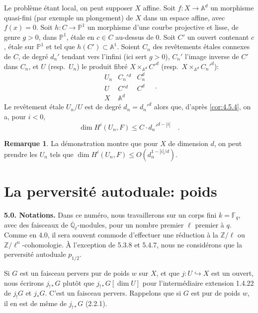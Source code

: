 \documentclass[12pt,a4paper]{article}
\theoremstyle{plain}
\theoremstyle{definition}
\newtheorem{remark}[theorem]{Remarque}
\newcommand{\into}{\hookrightarrow}
\begin{document}
Le probl\`{e}me \'{e}tant local, on peut supposer $X$ affine. Soit $f: X \to \mathbb{A}^{d}$ un morphisme quasi-fini (par exemple un plongement) de $X$ dans un espace affine, avec $f(x) = 0$. Soit $h: C \to \mathbb{P}^{1}$ un morphisme d'une courbe projective et lisse, de genre $g > 0$, dans $\mathbb{P}^{1}$, \'{e}tale en $c \in C$ au-dessus de $0$. Soit $C'$ un ouvert contenant $c$, \'{e}tale sur $\mathbb{P}^{1}$ et tel que $h(C') \subset \mathbb{A}^{1}$. Soient $C_{n}$ des rev\^{e}tements \'{e}tales connexes de $C$, de degr\'{e} $d_{n}'$ tendant vers l'infini (ici sert $g > 0$), $C_{n}'$ l'image inverse de $C'$ dans $C_{n}$, et $U$ (resp.\ $U_{n}$) le produit fibr\'{e} $X \times_{\mathbb{A}^{d}} C'^{d}$ (resp.\ $X \times_{\mathbb{A}^{d}} C_{n}'^{d}$):
\[
\begin{array}{ccc}
U_n & C_n'{}^d & C_n^d \\
U & C'{}^d & C^d \\
X & \mathbb{A}^d &
\end{array}
\quad.
\]
Le rev\^{e}tement \'{e}tale $U_{n}/U$ est de degr\'{e} $d_{n} = d_{n}'^{d}$ alors que, d'apr\`{e}s \ref{cor:4.5.4}, on a, pour $i < 0$,
\[
\dim H^{i}(U_{n}, F) \leq C \cdot d_{n}'^{d-|i|}\quad.
\]

\begin{remark}\label{rem:4.5.6}
La d\'{e}monstration montre que pour $X$ de dimension $d$, on peut prendre les $U_{n}$ tels que $\dim H^{i}(U_{n}, F) \leq O(d_{n}^{1-|i|/d})$.
\end{remark}


\section{La perversit\'{e} autoduale: poids}

\noindent\textbf{5.0. Notations.} Dans ce num\'{e}ro, nous travaillerons sur un corps fini $k = \mathbb{F}_{q}$, avec des faisceaux de $\overline{\mathbb{Q}}_{\ell}$-modules, pour un nombre premier $\ell$ premier \`{a} $q$. Comme en 4.0, il sera souvent commode d'effectuer une r\'{e}duction \`{a} la $\mathbb{Z}/\ell$ ou $\mathbb{Z}/\ell^{n}$-cohomologie. \`{A} l'exception de 5.3.8 et 5.4.7, nous ne consid\'{e}rons que la perversit\'{e} autoduale $p_{1/2}$.

Si $G$ est un faisceau pervers pur de poids $w$ sur $X$, et que $j: U \into X$ est un ouvert, nous \'{e}crirons $j_{!*}G$ plut\^{o}t que $j_{!*}G[\dim U]$ pour l'interm\'{e}diaire extension 1.4.22 de $j_{!}G$ et $j_{*}G$. C'est un faisceau pervers. Rappelons que si $G$ est pur de poids $w$, il en est de m\^{e}me de $j_{!*}G$ (2.2.1).
\end{document}
